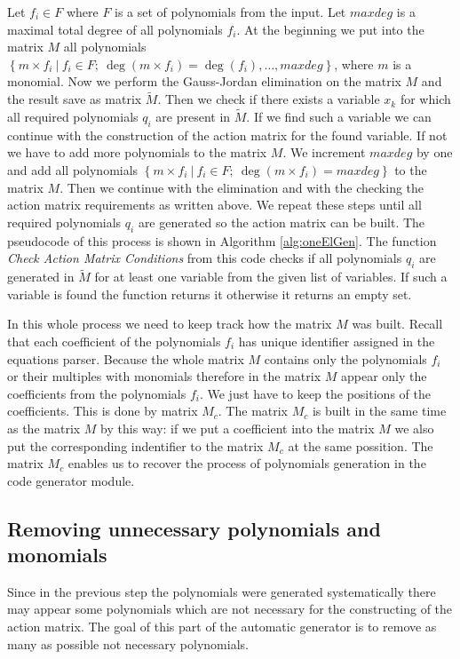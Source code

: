 Let $f_i \in F$ where $F$ is a set of polynomials from the input. Let $maxdeg$ is a maximal total degree of all polynomials $f_i$. At the beginning we put into the matrix $M$ all polynomials $\left\{m\times f_i\ |\ f_i \in F;\ \deg(m\times f_i) = \deg(f_i),\dots, maxdeg\right\}$, where $m$ is a monomial. Now we perform the Gauss-Jordan elimination on the matrix $M$ and the result save as matrix $\tilde{M}$. Then we check if there exists a variable $x_k$ for which all required polynomials $q_i$ are present in $\tilde{M}$. If we find such a variable we can continue with the construction of the action matrix for the found variable. If not we have to add more polynomials to the matrix $M$. We increment $maxdeg$ by one and add all polynomials $\left\{m\times f_i\ |\ f_i \in F;\ \deg(m\times f_i) = maxdeg\right\}$ to the matrix $M$. Then we continue with the elimination and with the checking the action matrix requirements as written above. We repeat these steps until all required polynomials $q_i$ are generated so the action matrix can be built. The pseudocode of this process is shown in Algorithm \ref{alg:oneElGen}. The function \textit{Check Action Matrix Conditions} from this code checks if all polynomials $q_i$ are generated in $\tilde{M}$ for at least one variable from the given list of variables. If such a variable is found the function returns it otherwise it returns an empty set.



In this whole process we need to keep track how the matrix $M$ was built. Recall that each coefficient of the polynomials $f_i$ has unique identifier assigned in the equations parser. Because the whole matrix $M$ contains only the polynomials $f_i$ or their multiples with monomials therefore in the matrix $M$ appear only the coefficients from the polynomials $f_i$. We just have to keep the positions of the coefficients. This is done by matrix $M_c$. The matrix $M_c$ is built in the same time as the matrix $M$ by this way: if we put a coefficient into the matrix $M$ we also put the corresponding indentifier to the matrix $M_c$ at the same possition. The matrix $M_c$ enables us to recover the process of polynomials generation in the code generator module.

\subsection{Removing unnecessary polynomials and monomials}
Since in the previous step the polynomials were generated systematically there may appear some polynomials which are not necessary for the constructing of the action matrix. The goal of this part of the automatic generator is to remove as many as possible not necessary polynomials.

